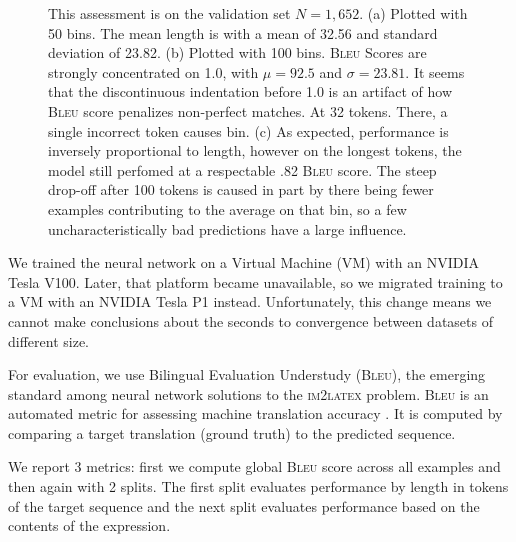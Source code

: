 \documentclass{article}
\newcommand{\BLEU}{\textsc{Bleu}}
\begin{document}
\begin{figure}[h]
\begin{subfigure}{1.0\textwidth}
		\caption{}
	\end{subfigure}
  \caption[Model]{This assessment is on the validation set $N=1,652$. (a)
  Plotted with 50 bins. The mean length is with a mean of  32.56 and standard
  deviation of 23.82. (b) Plotted with 100 bins. \BLEU{} Scores are strongly
  concentrated on 1.0, with $\mu = 92.5$ and $\sigma = 23.81$. It seems that the
  discontinuous indentation before 1.0 is an artifact of how \BLEU{} score
  penalizes non-perfect matches. At 32 tokens. There, a single incorrect token
  causes bin. (c) As expected, performance is inversely proportional to length,
  however on the longest tokens, the model still perfomed at a respectable .82
  \BLEU{} score. The steep drop-off after 100 tokens is caused in part by there
  being fewer examples contributing to the average on that bin, so a few
  uncharacteristically bad predictions have a large influence.} 
\end{figure}

We trained the neural network on a Virtual Machine (VM) with an NVIDIA Tesla
V100. Later, that platform became unavailable, so we migrated training to a VM
with an NVIDIA Tesla P1 instead. Unfortunately, this change means we cannot make
conclusions about the seconds to convergence between datasets of different size.

For evaluation, we use Bilingual Evaluation Understudy (\BLEU{}), the emerging
standard among neural network solutions to the \textsc{im2latex} problem. \BLEU{}
is an automated metric for assessing machine translation accuracy
\cite[1]{papineni2002bleu}. It is computed by comparing a target translation
(ground truth) to the predicted sequence.

We report 3 metrics: first we compute global \BLEU{} score across all examples and
then again with 2 splits. The first split evaluates performance by length in
tokens of the target sequence and the next split evaluates performance based on
the contents of the expression.
\end{document}

